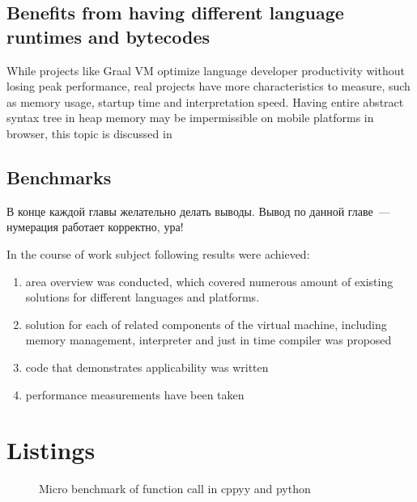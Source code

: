 \documentclass[times,specification,annotation]{itmo-student-thesis}
\begin{document}
\section{Benefits from having different language runtimes and bytecodes}
While projects like Graal VM optimize language developer productivity without losing peak performance, real projects have more characteristics to measure, such as memory usage, startup time and interpretation speed. Having entire abstract syntax tree in heap memory may be impermissible on mobile platforms in browser, this topic is discussed in \cite{ignition-iterpreter}

\section{Benchmarks}
\TODO

\chapterconclusion

В конце каждой главы желательно делать выводы. Вывод по данной главе~--- нумерация работает корректно, ура!

\startconclusionpage
In the course of work subject following results were achieved:
\begin{enumerate}
	\item area overview was conducted, which covered numerous amount of existing solutions for different languages and platforms.
	\item solution for each of related components of the virtual machine, including memory management, interpreter and just in time compiler was proposed
	\item code that demonstrates applicability was written
	\item performance measurements have been taken\TODO
\end{enumerate}


\printmainbibliography

\appendix

\chapter{Listings}
\begin{figure}[!h]
	\caption{Micro benchmark of function call in cppyy and python}\label{apx:cppyy-bench}
	
\end{figure}
\end{document}
